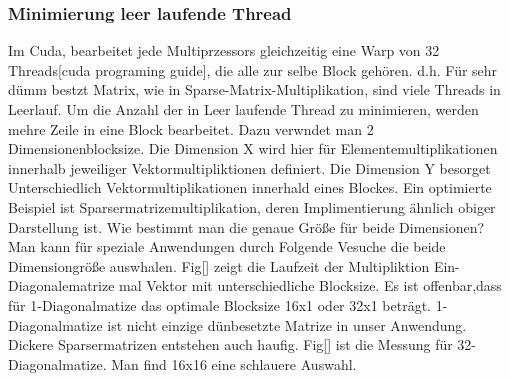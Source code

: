 \begin{firuge}[htbp]

\subsubsection{Minimierung leer laufende Thread}
Im Cuda, bearbeitet jede Multiprzessors gleichzeitig eine Warp von 32 Threads[cuda programing guide], die alle zur selbe Block gehören. d.h. Für sehr dümm bestzt Matrix, wie in Sparse-Matrix-Multiplikation, sind viele Threads in Leerlauf. Um die Anzahl der in Leer laufende Thread zu minimieren, werden mehre Zeile in eine Block bearbeitet. Dazu verwndet man 2 Dimensionenblocksize. Die Dimension X wird hier für Elementemultiplikationen innerhalb jeweiliger Vektormultipliktionen definiert. Die Dimension Y besorget Unterschiedlich Vektormultiplikationen innerhald eines Blockes. Ein optimierte Beispiel ist Sparsermatrizemultiplikation, deren Implimentierung ähnlich obiger Darstellung ist. Wie bestimmt man die genaue Größe für beide Dimensionen?  Man kann für speziale Anwendungen durch Folgende Vesuche die beide Dimensiongröße auswhalen. Fig[] zeigt die Laufzeit der Multipliktion Ein-Diagonalematrize mal Vektor mit unterschiedliche Blocksize. Es ist offenbar,dass für 1-Diagonalmatize das optimale Blocksize 16x1 oder 32x1 beträgt. 1-Diagonalmatize ist nicht einzige dünbesetzte Matrize in unser Anwendung. Dickere Sparsermatrizen entstehen auch haufig. Fig[] ist die Messung für 32-Diagonalmatize. Man find 16x16 eine schlauere Auswahl.



\end{firuge}

